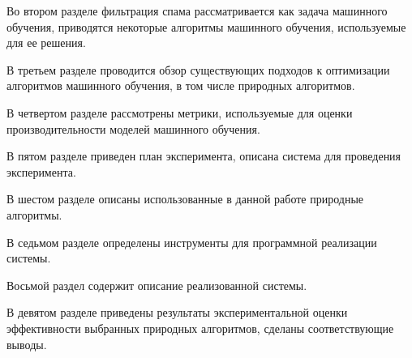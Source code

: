 Во втором разделе фильтрация спама рассматривается как задача машинного обучения,
приводятся некоторые алгоритмы машинного обучения, используемые для ее решения.

В третьем разделе проводится обзор существующих подходов к оптимизации алгоритмов машинного обучения, 
в том числе природных алгоритмов.

В четвертом разделе рассмотрены метрики, используемые для оценки производительности
моделей машинного обучения.

В пятом разделе приведен план эксперимента, описана система для проведения эксперимента.

В шестом разделе описаны использованные в данной работе природные алгоритмы.

В седьмом разделе определены инструменты для программной реализации системы.

Восьмой раздел содержит описание реализованной системы.

В девятом разделе приведены результаты экспериментальной оценки эффективности 
выбранных природных алгоритмов, сделаны соответствующие выводы.

